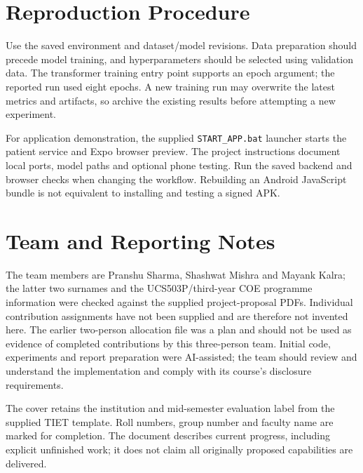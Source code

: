 \documentclass{tietreport}
\begin{document}
\section{Reproduction Procedure}
Use the saved environment and dataset/model revisions. Data preparation should precede model training, and hyperparameters should be selected using validation data. The transformer training entry point supports an epoch argument; the reported run used eight epochs. A new training run may overwrite the latest metrics and artifacts, so archive the existing results before attempting a new experiment.

For application demonstration, the supplied \texttt{START\_APP.bat} launcher starts the patient service and Expo browser preview. The project instructions document local ports, model paths and optional phone testing. Run the saved backend and browser checks when changing the workflow. Rebuilding an Android JavaScript bundle is not equivalent to installing and testing a signed APK.

\section{Team and Reporting Notes}
The team members are Pranshu Sharma, Shashwat Mishra and Mayank Kalra; the latter two surnames and the UCS503P/third-year COE programme information were checked against the supplied project-proposal PDFs. Individual contribution assignments have not been supplied and are therefore not invented here. The earlier two-person allocation file was a plan and should not be used as evidence of completed contributions by this three-person team. Initial code, experiments and report preparation were AI-assisted; the team should review and understand the implementation and comply with its course's disclosure requirements.

The cover retains the institution and mid-semester evaluation label from the supplied TIET template. Roll numbers, group number and faculty name are marked for completion. The document describes current progress, including explicit unfinished work; it does not claim all originally proposed capabilities are delivered.
\end{document}
